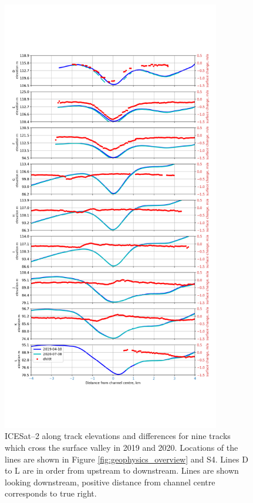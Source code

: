 \begin{figure}[!ht]
\includegraphics[width=0.85\textwidth]{chapters/2/icesat2_b.png}
\caption[ICESat--2 profiles]{ICESat--2 along track elevations and differences for nine tracks which cross the surface valley in 2019 and 2020. Locations of the lines are shown in Figure \ref{fig:geophysics_overview} and S4. Lines D to L are in order from upstream to downstream. Lines are shown looking downstream, positive distance from channel centre corresponds to true right.
 }
\label{fig:icesat2_b}
\end{figure}


